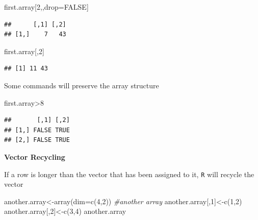 \documentclass[
]{gitbook}
\newenvironment{Shaded}{\begin{snugshade}}{\end{snugshade}}
\newcommand{\AttributeTok}[1]{\textcolor[rgb]{0.77,0.63,0.00}{#1}}
\newcommand{\CommentTok}[1]{\textcolor[rgb]{0.56,0.35,0.01}{\textit{#1}}}
\newcommand{\ConstantTok}[1]{\textcolor[rgb]{0.00,0.00,0.00}{#1}}
\newcommand{\DecValTok}[1]{\textcolor[rgb]{0.00,0.00,0.81}{#1}}
\newcommand{\FunctionTok}[1]{\textcolor[rgb]{0.00,0.00,0.00}{#1}}
\newcommand{\NormalTok}[1]{#1}
\newcommand{\OtherTok}[1]{\textcolor[rgb]{0.56,0.35,0.01}{#1}}
\newcommand{\SpecialCharTok}[1]{\textcolor[rgb]{0.00,0.00,0.00}{#1}}
\begin{document}
\begin{Shaded}
\begin{Highlighting}[]
\NormalTok{first.array[}\DecValTok{2}\NormalTok{,,drop}\OtherTok{=}\ConstantTok{FALSE}\NormalTok{]}
\end{Highlighting}
\end{Shaded}

\begin{verbatim}
##      [,1] [,2]
## [1,]    7   43
\end{verbatim}

\begin{Shaded}
\begin{Highlighting}[]
\NormalTok{first.array[,}\DecValTok{2}\NormalTok{]}
\end{Highlighting}
\end{Shaded}

\begin{verbatim}
## [1] 11 43
\end{verbatim}

Some commands will preserve the array structure

\begin{Shaded}
\begin{Highlighting}[]
\NormalTok{first.array}\SpecialCharTok{\textgreater{}}\DecValTok{8}
\end{Highlighting}
\end{Shaded}

\begin{verbatim}
##       [,1] [,2]
## [1,] FALSE TRUE
## [2,] FALSE TRUE
\end{verbatim}

\textbf{Vector Recycling}

If a row is longer than the vector that has been assigned to it, \texttt{R} will recycle the vector

\begin{Shaded}
\begin{Highlighting}[]
\NormalTok{another.array}\OtherTok{\textless{}{-}}\FunctionTok{array}\NormalTok{(}\AttributeTok{dim=}\FunctionTok{c}\NormalTok{(}\DecValTok{4}\NormalTok{,}\DecValTok{2}\NormalTok{)) }\CommentTok{\#another array }
\NormalTok{another.array[,}\DecValTok{1}\NormalTok{]}\OtherTok{\textless{}{-}}\FunctionTok{c}\NormalTok{(}\DecValTok{1}\NormalTok{,}\DecValTok{2}\NormalTok{)}
\NormalTok{another.array[,}\DecValTok{2}\NormalTok{]}\OtherTok{\textless{}{-}}\FunctionTok{c}\NormalTok{(}\DecValTok{3}\NormalTok{,}\DecValTok{4}\NormalTok{)}
\NormalTok{another.array}
\end{Highlighting}
\end{Shaded}
\end{document}

